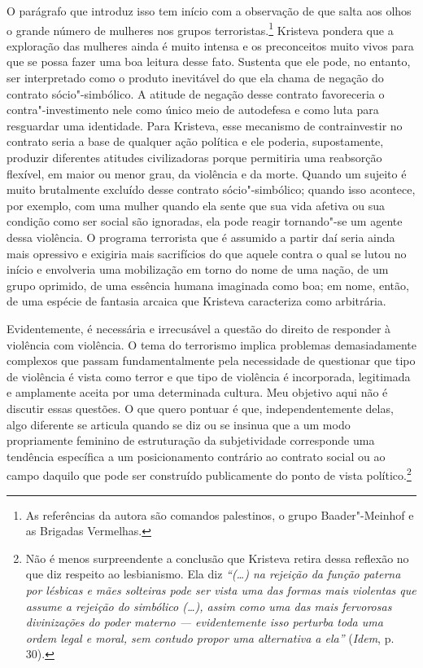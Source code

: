 O parágrafo que introduz isso tem início com a observação de que salta
aos olhos o grande número de mulheres nos grupos terroristas.\footnote{As
  referências da autora são comandos palestinos, o grupo Baader"-Meinhof
  e as Brigadas Vermelhas.} Kristeva pondera que a exploração das
mulheres ainda é muito intensa e os preconceitos muito vivos para que se
possa fazer uma boa leitura desse fato. Sustenta que ele pode, no
entanto, ser interpretado como o produto inevitável do que ela chama de
negação do contrato sócio"-simbólico. A atitude de negação desse contrato
favoreceria o contra"-investimento nele como único meio de autodefesa e
como luta para resguardar uma identidade. Para Kristeva, esse mecanismo
de contrainvestir no contrato seria a base de qualquer ação política e
ele poderia, supostamente, produzir diferentes atitudes civilizadoras
porque permitiria uma reabsorção flexível, em maior ou menor grau, da
violência e da morte. Quando um sujeito é muito brutalmente excluído
desse contrato sócio"-simbólico; quando isso acontece, por exemplo, com
uma mulher quando ela sente que sua vida afetiva ou sua condição como
ser social são ignoradas, ela pode reagir tornando"-se um agente dessa
violência. O programa terrorista que é assumido a partir daí seria ainda
mais opressivo e exigiria mais sacrifícios do que aquele contra o qual
se lutou no início e envolveria uma mobilização em torno do nome de uma
nação, de um grupo oprimido, de uma essência humana imaginada como boa;
em nome, então, de uma espécie de fantasia arcaica que Kristeva
caracteriza como arbitrária.

Evidentemente, é necessária e irrecusável a questão do direito de
responder à violência com violência. O tema do terrorismo implica
problemas demasiadamente complexos que passam fundamentalmente pela
necessidade de questionar que tipo de violência é vista como terror e
que tipo de violência é incorporada, legitimada e amplamente aceita por
uma determinada cultura. Meu objetivo aqui não é discutir essas
questões. O que quero pontuar é que, independentemente delas, algo
diferente se articula quando se diz ou se insinua que a um modo
propriamente feminino de estruturação da subjetividade corresponde uma
tendência específica a um posicionamento contrário ao contrato social ou
ao campo daquilo que pode ser construído publicamente do ponto de vista
político.\footnote{Não é menos surpreendente a conclusão que Kristeva
  retira dessa reflexão no que diz respeito ao lesbianismo. Ela diz
  \emph{``(\ldots{}) na rejeição da função paterna por lésbicas e mães
      solteiras pode ser vista uma das formas mais violentas que assume a
      rejeição do simbólico (\ldots{}), assim como uma das mais fervorosas
      divinizações do poder materno --- evidentemente isso perturba toda uma
      ordem legal e moral, sem contudo propor uma alternativa a ela''}
  (\emph{Idem}, p. 30).}

